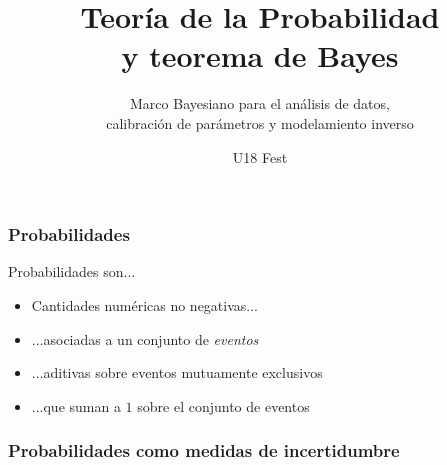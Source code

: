 \documentclass[10pt]{beamer}
\subtitle{Marco Bayesiano para el análisis de datos,\\
calibración de parámetros y modelamiento inverso}
\title{Teoría de la Probabilidad\\y teorema de Bayes}
\institute{Universidad Industrial de Santander}
\date{U18 Fest}
\begin{document}
\begin{frame}[noframenumbering]
  \titlepage
\end{frame}

\begin{frame}
  \frametitle{Probabilidades}
  Probabilidades son...
  \begin{itemize}
  \item Cantidades numéricas no negativas...
  \item ...asociadas a un conjunto de \emph{eventos}
  \item ...aditivas sobre eventos mutuamente exclusivos
  \item ...que suman a $1$ sobre el conjunto de eventos
  \end{itemize}
\end{frame}
%
\begin{frame}
  \frametitle{Probabilidades como medidas de incertidumbre}
\end{frame}
\end{document}
